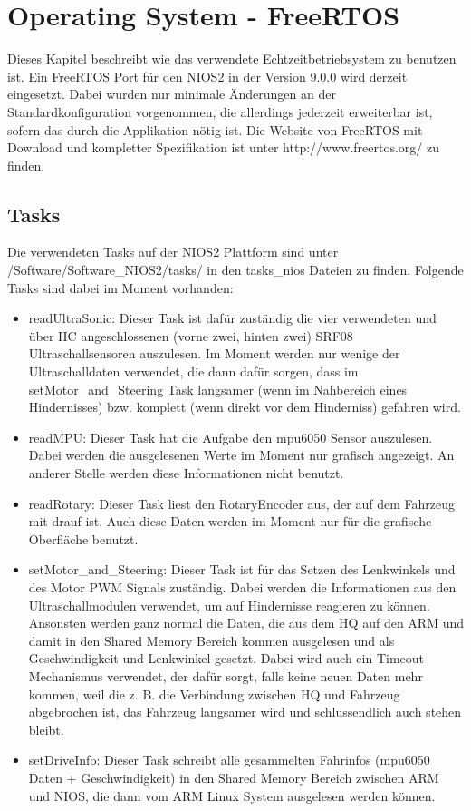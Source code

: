  \chapter{Operating System - FreeRTOS}
 Dieses Kapitel beschreibt wie das verwendete Echtzeitbetriebsystem zu benutzen ist. Ein FreeRTOS Port für den NIOS2 in der Version 9.0.0 wird derzeit eingesetzt. Dabei wurden nur minimale Änderungen an der Standardkonfiguration vorgenommen, die allerdings jederzeit erweiterbar ist, sofern das durch die Applikation nötig ist. Die Website von FreeRTOS mit Download und kompletter Spezifikation ist unter http://www.freertos.org/ zu finden. 
 \section{Tasks}
 Die verwendeten Tasks auf der NIOS2 Plattform sind unter /Software/Software\_NIOS2/tasks/ in den tasks\_nios Dateien zu finden. Folgende Tasks sind dabei im Moment vorhanden:
 \begin{itemize}
  \item readUltraSonic: Dieser Task ist dafür zuständig die vier verwendeten und über IIC angeschlossenen (vorne zwei, hinten zwei) SRF08 Ultraschallsensoren auszulesen. Im Moment werden nur wenige der Ultraschalldaten verwendet, die dann dafür sorgen, dass im setMotor\_and\_Steering Task langsamer (wenn im Nahbereich eines Hindernisses) bzw. komplett (wenn direkt vor dem Hinderniss) gefahren wird.
  \item readMPU: Dieser Task hat die Aufgabe den mpu6050 Sensor auszulesen. Dabei werden die ausgelesenen Werte im Moment nur grafisch angezeigt. An anderer Stelle werden diese Informationen nicht benutzt.
  \item readRotary: Dieser Task liest den RotaryEncoder aus, der auf dem Fahrzeug mit drauf ist. Auch diese Daten werden im Moment nur für die grafische Oberfläche benutzt.
  \item setMotor\_and\_Steering: Dieser Task ist für das Setzen des Lenkwinkels und des Motor PWM Signals zuständig. Dabei werden die Informationen aus den Ultraschallmodulen verwendet, um auf Hindernisse reagieren zu können. Ansonsten werden ganz normal die Daten, die aus dem HQ auf den ARM und damit in den Shared Memory Bereich kommen ausgelesen und als Geschwindigkeit und Lenkwinkel gesetzt. Dabei wird auch ein Timeout Mechanismus verwendet, der dafür sorgt, falls keine neuen Daten mehr kommen, weil die z. B. die Verbindung zwischen HQ und Fahrzeug abgebrochen ist, das Fahrzeug langsamer wird und schlussendlich auch stehen bleibt.
  \item setDriveInfo: Dieser Task schreibt alle gesammelten Fahrinfos (mpu6050 Daten + Geschwindigkeit) in den Shared Memory Bereich zwischen ARM und NIOS, die dann vom ARM Linux System ausgelesen werden können.
 \end{itemize}
